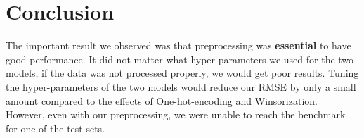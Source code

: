 \documentclass{article}
\begin{document}
\section{Conclusion}

The important result we observed was that preprocessing was \textbf{essential} to have good performance. It did not matter what hyper-parameters we used for the two models, if the data was not processed properly, we would get poor results. Tuning the hyper-parameters of the two models would reduce our RMSE by only a small amount compared to the effects of One-hot-encoding and Winsorization. However, even with our preprocessing, we were unable to reach the benchmark for one of the test sets. 
\end{document}
